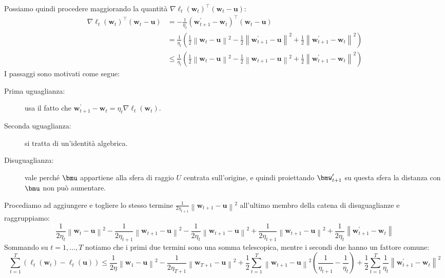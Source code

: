\documentclass[\main/main.tex]{subfiles}
\begin{document}
\begin{analysis}
    Possiamo quindi procedere maggiorando la quantità \(\nabla \ell_{t}\left(\boldsymbol{w}_{t}\right)^{\top}\left(\boldsymbol{w}_{t}-\boldsymbol{u}\right)\):
    \begin{align*}
    \nabla \ell_{t}\left(\boldsymbol{w}_{t}\right)^{\top}\left(\boldsymbol{w}_{t}-\boldsymbol{u}\right) &=-\frac{1}{\eta_{t}}\left(\boldsymbol{w}_{t+1}^{\prime}-\boldsymbol{w}_{t}\right)^{\top}\left(\boldsymbol{w}_{t}-\boldsymbol{u}\right) \\ &=\frac{1}{\eta_{t}}\left(\frac{1}{2}\left\|\boldsymbol{w}_{t}-\boldsymbol{u}\right\|^{2}-\frac{1}{2}\left\|\boldsymbol{w}_{t+1}^{\prime}-\boldsymbol{u}\right\|^{2}+\frac{1}{2}\left\|\boldsymbol{w}_{t+1}^{\prime}-\boldsymbol{w}_{t}\right\|^{2}\right) \\ & \leq \frac{1}{\eta_{t}}\left(\frac{1}{2}\left\|\boldsymbol{w}_{t}-\boldsymbol{u}\right\|^{2}-\frac{1}{2}\left\|\boldsymbol{w}_{t+1}-\boldsymbol{u}\right\|^{2}+\frac{1}{2}\left\|\boldsymbol{w}_{t+1}^{\prime}-\boldsymbol{w}_{t}\right\|^{2}\right)
    \end{align*}
    I passaggi sono motivati come segue:
    \begin{description}
        \item[Prima uguaglianza:] usa il fatto che \(\boldsymbol{w}_{t+1}^{\prime}-\boldsymbol{w}_{t}=\eta_{t} \nabla \ell_{t}\left(\boldsymbol{w}_{t}\right)\).
        \item[Seconda uguaglianza:] si tratta di un'identità algebrica.
        \item[Disuguaglianza:] vale perché \(\bmu\) appartiene alla sfera di raggio \(U\) centrata sull'origine, e quindi proiettando \(\bmw'_{t+1}\) su questa sfera la distanza con \(\bmu\) non può aumentare.
    \end{description}
    Procediamo ad aggiungere e togliere lo stesso termine \(\frac{1}{2 \eta_{t+1}}\left\|\boldsymbol{w}_{t+1}-\boldsymbol{u}\right\|^{2}\) all'ultimo membro della catena di disuguaglianze e raggruppiamo:
    \[\frac{1}{2 \eta_{t}}\left\|\boldsymbol{w}_{t}-\boldsymbol{u}\right\|^{2}-\frac{1}{2 \eta_{t+1}}\left\|\boldsymbol{w}_{t+1}-\boldsymbol{u}\right\|^{2}-\frac{1}{2 \eta_{t}}\left\|\boldsymbol{w}_{t+1}-\boldsymbol{u}\right\|^{2}+\frac{1}{2 \eta_{t+1}}\left\|\boldsymbol{w}_{t+1}-\boldsymbol{u}\right\|^{2}+\frac{1}{2 \eta_{t}}\left\|\boldsymbol{w}_{t+1}^{\prime}-\boldsymbol{w}_{t}\right\|\]
    Sommando su \(t=1,\ldots,T\) notiamo che i primi due termini sono una somma telescopica, mentre i secondi due hanno un fattore comune:
    \[
        \sum_{t=1}^{T}\left(\ell_{t}\left(\boldsymbol{w}_{t}\right)-\ell_{t}(\boldsymbol{u})\right) \leq \frac{1}{2 \eta}\left\|\boldsymbol{w}_{1}-\boldsymbol{u}\right\|^{2}-\frac{1}{2 \eta_{T+1}} \left\|\boldsymbol{w}_{T+1}-\boldsymbol{u}\right\|^{2} +\frac{1}{2} \sum_{t=1}^{T}\left\|\boldsymbol{w}_{t+1}-\boldsymbol{u}\right\|^{2}\left(\frac{1}{\eta_{t+1}}-\frac{1}{\eta_{t}}\right)+\frac{1}{2} \sum_{t=1}^{T} \frac{1}{\eta_{t}}\left\|\boldsymbol{w}_{t+1}^{\prime}-\boldsymbol{w}_{t}\right\|^{2}
\]
\end{analysis}
\end{document}
